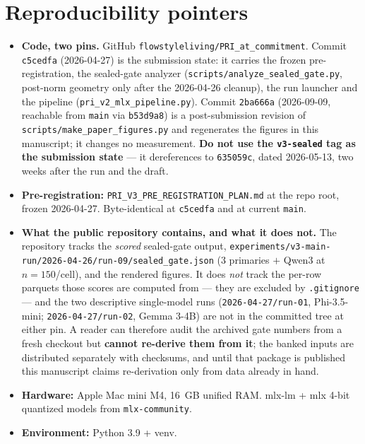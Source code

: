\documentclass[10pt, letterpaper]{article}
\begin{document}
\section{Reproducibility pointers}
\label{app:repro}

\begin{itemize}[leftmargin=*, itemsep=2pt, topsep=2pt]
  \item \textbf{Code, two pins.} GitHub
  \texttt{flowstyleliving/PRI\_at\_commitment}. Commit
  \texttt{c5cedfa} (2026-04-27) is the submission state: it carries the
  frozen pre-registration, the sealed-gate analyzer
  (\texttt{scripts/analyze\_sealed\_gate.py}, post-norm geometry only
  after the 2026-04-26 cleanup), the run launcher and the pipeline
  (\texttt{pri\_v2\_mlx\_pipeline.py}). Commit \texttt{2ba666a}
  (2026-09-09, reachable from \texttt{main} via \texttt{b53d9a8}) is a
  post-submission revision of \texttt{scripts/make\_paper\_figures.py}
  and regenerates the figures in this manuscript; it changes no
  measurement. \textbf{Do not use the \texttt{v3-sealed} tag as the
  submission state} --- it dereferences to \texttt{635059c}, dated
  2026-05-13, two weeks after the run and the draft.
  \item \textbf{Pre-registration:}
  \texttt{PRI\_V3\_PRE\_REGISTRATION\_PLAN.md} at the repo root,
  frozen 2026-04-27. Byte-identical at \texttt{c5cedfa} and at
  current \texttt{main}.
  \item \textbf{What the public repository contains, and what it does
  not.} The repository tracks the \emph{scored} sealed-gate output,
  \texttt{experiments/v3-main-run/2026-04-26/run-09/sealed\_gate.json}
  (3 primaries $+$ Qwen3 at $n=150$/cell), and the rendered figures. It
  does \emph{not} track the per-row parquets those scores are computed
  from --- they are excluded by \texttt{.gitignore} --- and the two
  descriptive single-model runs
  (\texttt{2026-04-27/run-01}, Phi-3.5-mini; \texttt{2026-04-27/run-02},
  Gemma 3-4B) are not in the committed tree at either pin. A reader can
  therefore audit the archived gate numbers from a fresh checkout but
  \textbf{cannot re-derive them from it}; the banked inputs are
  distributed separately with checksums, and until that package is
  published this manuscript claims re-derivation only from data already
  in hand.
  \item \textbf{Hardware:} Apple Mac mini M4, 16~GB unified RAM.
  mlx-lm + mlx 4-bit quantized models from \texttt{mlx-community}.
  \item \textbf{Environment:} Python 3.9 + venv.

\end{itemize}
\end{document}

